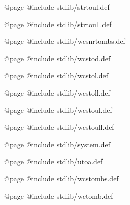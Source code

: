 @page
@include stdlib/strtoul.def

@page
@include stdlib/strtoull.def

@page
@include stdlib/wcsnrtombs.def

@page
@include stdlib/wcstod.def

@page
@include stdlib/wcstol.def

@page
@include stdlib/wcstoll.def

@page
@include stdlib/wcstoul.def

@page
@include stdlib/wcstoull.def

@page
@include stdlib/system.def

@page
@include stdlib/utoa.def

@page
@include stdlib/wcstombs.def

@page
@include stdlib/wctomb.def

